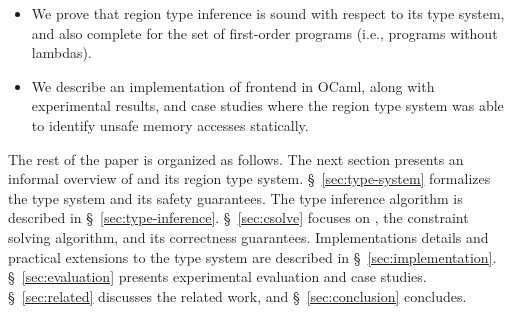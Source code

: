 \begin{itemize}
  \item We prove that region type inference is sound with respect to
  its type system, and also complete for the set of first-order
  programs (i.e., programs without lambdas). 

  \item We describe an implementation of \name frontend in OCaml,
  along with experimental results, and case studies where the region
  type system was able to identify unsafe memory accesses statically.
  
\end{itemize}

The rest of the paper is organized as follows. The next section
presents an informal overview of \name and its region type system.
\S~\ref{sec:type-system} formalizes the type system and its safety
guarantees. The type inference algorithm is described in
\S~\ref{sec:type-inference}. \S~\ref{sec:csolve} focuses on \csolve,
the constraint solving algorithm, and its correctness guarantees.
Implementations details and practical extensions to the type system
are described in \S~\ref{sec:implementation}. \S~\ref{sec:evaluation}
presents experimental evaluation and case studies.
\S~\ref{sec:related} discusses the related work, and
\S~\ref{sec:conclusion} concludes.
